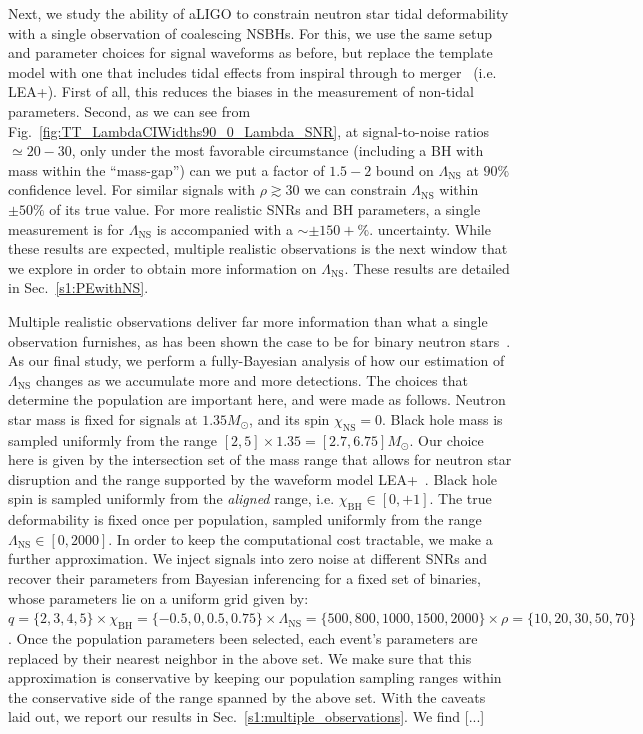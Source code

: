 \documentclass[aps,prd,amsmath,floats,floatfix, twocolumn,
superscriptaddress,nofootinbib,showpacs]{revtex4-1}
\newcommand{\prayush}{\textcolor{red!40!black}}
\newcommand{\lambdans}{\Lambda_\mathrm{NS}}
\newcommand{\chibh}{\chi_\mathrm{BH}}
\newcommand{\chins}{\chi_\mathrm{NS}}
\begin{document}
Next, we study the ability of aLIGO to constrain neutron star tidal 
deformability with a single observation of coalescing NSBHs. For this, we
use the same setup and parameter choices for signal waveforms as before, but
replace the template model with one that includes tidal effects from inspiral
through to merger~\cite{Lackey:2013axa} (i.e. LEA+). First of all, this reduces
the biases in the measurement of non-tidal parameters. Second, as we can see
from Fig.~\ref{fig:TT_LambdaCIWidths90_0_Lambda_SNR}, at signal-to-noise
ratios $\simeq 20-30$, only under the most favorable circumstance (including a
BH with mass within the ``mass-gap'') can we put a factor of $1.5-2$ bound on
$\lambdans$ at $90\%$ confidence level. For similar signals with 
$\rho\gtrsim 30$ we can constrain $\lambdans$ within $\pm 50\%$ of its true
value. For more realistic SNRs and BH parameters, a single measurement is 
for $\lambdans$ is accompanied with a $\sim\pm150+\%$. uncertainty. While these
results are expected, multiple realistic observations is the next window that 
we explore in order to obtain more information on $\lambdans$. These results 
are detailed in Sec.~\ref{s1:PEwithNS}.


Multiple realistic observations deliver far more information than what a single
observation furnishes, as has been shown the case to be for binary neutron
stars~\cite{DelPozzo:13}. As our final study, we perform a fully-Bayesian 
analysis of how our estimation of $\lambdans$ changes as we accumulate more and
more detections. The choices that determine the population are important here,
and were made as follows. Neutron star mass is fixed for signals at
$1.35M_\odot$, and its spin $\chins=0$. Black hole mass is sampled uniformly
from the range $[2,5]\times 1.35=[2.7, 6.75]M_\odot$. Our choice here is given
by the intersection set of the mass range that allows for neutron star disruption
and the range supported by the waveform model LEA+~\cite{Foucart2012,
Foucart:2013a,Lackey:2013axa}. Black hole spin is sampled uniformly from the
{\it aligned} range, i.e. $\chibh\in[0,+1]$. The true deformability is fixed
once per population, sampled uniformly from the range $\lambdans\in[0,2000]$.
In order to keep the computational cost tractable, we make a further 
approximation. We inject signals into zero noise at different SNRs and recover
their parameters from Bayesian inferencing for a fixed set of binaries,
whose parameters lie on a uniform grid given by:
$q=\{2,3,4,5\}\times\chibh=\{-0.5,0,0.5,0.75\}\times\lambdans=\{500,800,1000,1500,2000\}\times\rho=\{10,20,30,50,70\}$.
Once the population parameters been selected, each event's parameters are
replaced by their nearest neighbor in the above set. We make sure that this 
approximation is conservative by keeping our population sampling ranges within the
conservative side of the range spanned by the above set. With the caveats
laid out, we report our results in Sec.~\ref{s1:multiple_observations}.
% 
We find \prayush{[...]}
\end{document}
